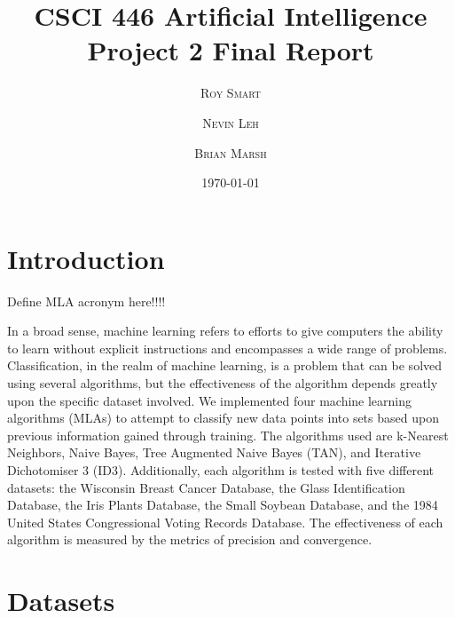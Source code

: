 \documentclass{article}
\title{\vspace{-15mm}\fontsize{24pt}{10pt}\selectfont\textbf{CSCI 446 Artificial Intelligence \\ Project 2 Final Report} \\[-2mm]} %
\date{\today}
\author{
\large
\textsc{Roy Smart} \and \textsc{Nevin Leh} \and \textsc{Brian Marsh}\\[2mm] %
}
\begin{document}
\maketitle %

\thispagestyle{fancy} %



\normalsize

\begin{abstract}
	
\end{abstract}
\section{Introduction}


Define MLA acronym here!!!!

	In a broad sense, machine learning refers to efforts to give computers the ability to learn without explicit instructions and encompasses a wide range of problems.  Classification, in the realm of machine learning, is a problem that can be solved using several algorithms, but the effectiveness of the algorithm depends greatly upon the specific dataset involved.  We implemented four machine learning algorithms (MLAs) to attempt to classify new data points into sets based upon previous information gained through training.  The algorithms used are k-Nearest Neighbors, Naive Bayes, Tree Augmented Naive Bayes (TAN), and Iterative Dichotomiser 3 (ID3).  Additionally, each algorithm is tested with five different datasets: the Wisconsin Breast Cancer Database, the Glass Identification Database, the Iris Plants Database, the Small Soybean Database, and the 1984 United States Congressional Voting Records Database.  The effectiveness of each algorithm is measured by the metrics of precision and convergence.  

\section{Datasets}
\end{document}
